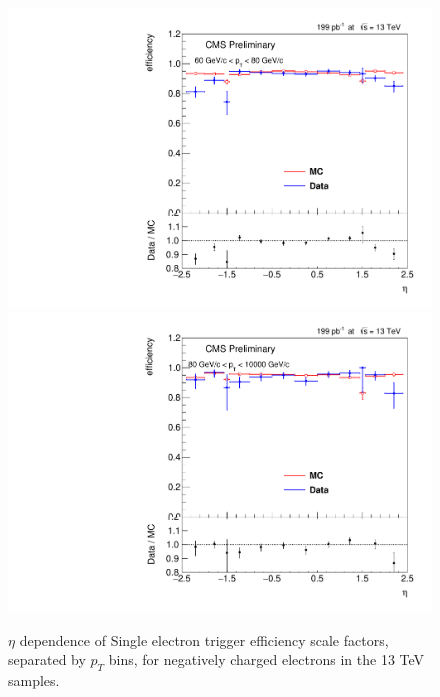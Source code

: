\begin{figure}
\includegraphics[width=0.45\linewidth]{plots/efficiency/13_zeehlt_negative/PtBins_eta_pt10.pdf}
\includegraphics[width=0.45\linewidth]{plots/efficiency/13_zeehlt_negative/PtBins_eta_pt11.pdf}
\caption{$\eta$ dependence of Single electron trigger efficiency scale factors, separated by $p_T$ bins, for negatively charged electrons in the 13 TeV samples.}
\label{fig:Eff:el:13:HLT:neg}
\end{figure}

